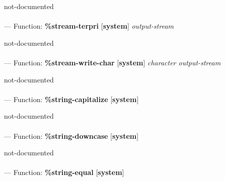 \begin{adjustwidth}{5em}{5em}
not-documented
\end{adjustwidth}

\paragraph{}
\label{SYSTEM:STREAM-TERPRI}
--- Function: \textbf{\%stream-terpri} [\textbf{system}] \textit{output-stream}

\begin{adjustwidth}{5em}{5em}
not-documented
\end{adjustwidth}

\paragraph{}
\label{SYSTEM:STREAM-WRITE-CHAR}
--- Function: \textbf{\%stream-write-char} [\textbf{system}] \textit{character output-stream}

\begin{adjustwidth}{5em}{5em}
not-documented
\end{adjustwidth}

\paragraph{}
\label{SYSTEM:STRING-CAPITALIZE}
--- Function: \textbf{\%string-capitalize} [\textbf{system}] \textit{}

\begin{adjustwidth}{5em}{5em}
not-documented
\end{adjustwidth}

\paragraph{}
\label{SYSTEM:STRING-DOWNCASE}
--- Function: \textbf{\%string-downcase} [\textbf{system}] \textit{}

\begin{adjustwidth}{5em}{5em}
not-documented
\end{adjustwidth}

\paragraph{}
\label{SYSTEM:STRING-EQUAL}
--- Function: \textbf{\%string-equal} [\textbf{system}] \textit{}

